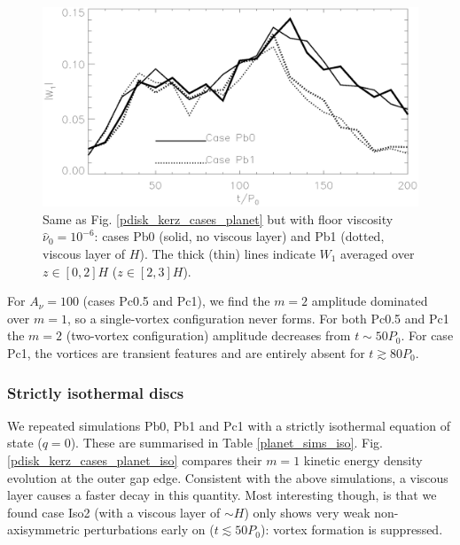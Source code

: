 \begin{figure}
  \centering
  \includegraphics[width=\linewidth]{figures/pdisk_kerz_cases_nu6}
  \caption{Same as Fig. \ref{pdisk_kerz_cases_planet} but with
    floor viscosity $\hat{\nu}_0=10^{-6}$: cases Pb0 (solid, no viscous layer) and Pb1
    (dotted, viscous layer of $H$). The thick (thin) lines indicate
    $W_1$ averaged over $z\in[0,2]H$
    ($z\in[2,3]H$). 
    \label{pdisk_kerz_cases_planet_hivisc}}
\end{figure}


For $A_\nu=100$ (cases Pc0.5 and Pc1), we find the $m=2$ amplitude
dominated over $m=1$, so a single-vortex configuration never
forms. For both Pc0.5 and Pc1 the $m=2$ (two-vortex configuration)
amplitude decreases from $t\sim 50P_0$. For case Pc1, the vortices are
transient features and are entirely absent for $t\gtrsim80P_0$.  


\subsubsection{Strictly isothermal discs} 
We repeated simulations Pb0, Pb1 and Pc1 with a strictly isothermal
equation of state ($q=0$). These are summarised in Table
\ref{planet_sims_iso}. Fig. \ref{pdisk_kerz_cases_planet_iso} compares
their $m=1$ kinetic energy density evolution at the outer gap edge. Consistent with the
above simulations, a viscous layer causes a faster decay in this
quantity. Most interesting though, is that we found case Iso2 (with a viscous
layer of $\sim H$) only shows very weak non-axisymmetric perturbations
early on ($t\lesssim 50P_0$): vortex formation is suppressed. 



